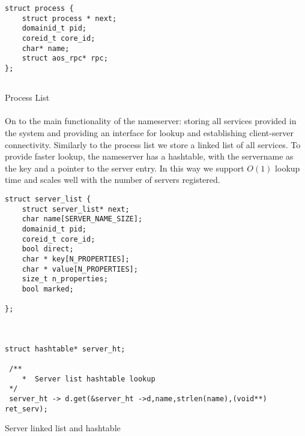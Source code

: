 \begin{code}


\begin{mdframed}[style=myframe]
\begin{verbatim}
struct process {
    struct process * next;
    domainid_t pid;
    coreid_t core_id;
    char* name;
    struct aos_rpc* rpc;
};


\end{verbatim}
\end{mdframed}
\caption{Process List}
\label{code:processlist}
\newline
\end{code}


\paragraph{}

On to the main functionality of the nameserver: storing all services provided in the system and providing an interface for lookup and establishing client-server connectivity. Similarly to the process list we store a linked list of all services. To provide faster lookup, the nameserver has a hashtable, with the servername as the key and a pointer to the server entry. In this way we support $O(1)$ lookup time and scales well with the number of servers registered. 
\begin{code}


\begin{mdframed}[style=myframe]
\begin{verbatim}
struct server_list {
    struct server_list* next;
    char name[SERVER_NAME_SIZE];
    domainid_t pid;
    coreid_t core_id;
    bool direct;
    char * key[N_PROPERTIES];
    char * value[N_PROPERTIES];
    size_t n_properties;
    bool marked;

};



struct hashtable* server_ht;

 /**
    *  Server list hashtable lookup
 */
 server_ht -> d.get(&server_ht ->d,name,strlen(name),(void**) ret_serv);
\end{verbatim}
\end{mdframed}
\caption{Server linked list and hashtable}
\newline
\label{code:server_list}
\end{code}
